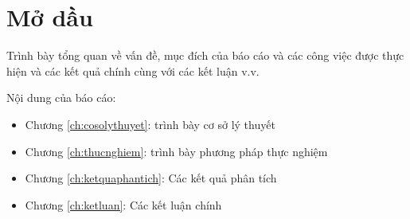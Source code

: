\chapter{Mở dầu}
Trình bày tổng quan về vấn đề, mục đích của báo cáo và các công việc được thực hiện và các kết quả chính cùng với các kết luận v.v. 

Nội dung của báo cáo: 

\begin{itemize}
\item Chương \ref{ch:cosolythuyet}: trình bày cơ sở lý thuyết
\item Chương \ref{ch:thucnghiem}: trình bày phương pháp thực nghiệm
\item Chương \ref{ch:ketquaphantich}: Các kết quả phân tích
\item Chương \ref{ch:ketluan}: Các kết luận chính
\end{itemize}
